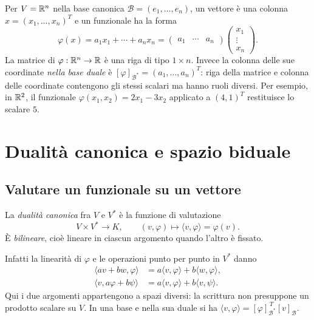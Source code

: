 \begin{esempio}
Per $V=\mathbb{R}^n$ nella base canonica $\mathcal B=(e_1,\ldots,e_n)$, un vettore è una colonna $x=(x_1,\ldots,x_n)^T$ e un funzionale ha la forma
\[
 \varphi(x)=a_1x_1+\cdots+a_nx_n
 =\begin{pmatrix}a_1&\cdots&a_n\end{pmatrix}
 \begin{pmatrix}x_1\\\vdots\\x_n\end{pmatrix}.
\]
La matrice di $\varphi:\mathbb{R}^n\to\mathbb{R}$ è una riga di tipo $1\times n$. Invece la colonna delle sue coordinate \emph{nella base duale} è $[\varphi]_{\mathcal B^*}=(a_1,\ldots,a_n)^T$: riga della matrice e colonna delle coordinate contengono gli stessi scalari ma hanno ruoli diversi. Per esempio, in $\mathbb{R}^2$, il funzionale $\varphi(x_1,x_2)=2x_1-3x_2$ applicato a $(4,1)^T$ restituisce lo scalare $5$.
\end{esempio}

\section{Dualità canonica e spazio biduale}
\subsection{Valutare un funzionale su un vettore}
\begin{definizione}
La \emph{dualità canonica} fra $V$ e $V^*$ è la funzione di valutazione
\[
 V\times V^*\longrightarrow K,\qquad (v,\varphi)\longmapsto
 \langle v,\varphi\rangle=\varphi(v).
\]
È \emph{bilineare}, cioè lineare in ciascun argomento quando l'altro è fissato.
\end{definizione}
Infatti la linearità di $\varphi$ e le operazioni punto per punto in $V^*$ danno
\begin{align*}
 \langle av+bw,\varphi\rangle&=a\langle v,\varphi\rangle+b\langle w,\varphi\rangle,\\
 \langle v,a\varphi+b\psi\rangle&=a\langle v,\varphi\rangle+b\langle v,\psi\rangle.
\end{align*}
Qui i due argomenti appartengono a spazi diversi: la scrittura non presuppone un prodotto scalare su $V$. In una base e nella sua duale si ha $\langle v,\varphi\rangle=[\varphi]_{\mathcal B^*}^{\,T}[v]_{\mathcal B}$.

